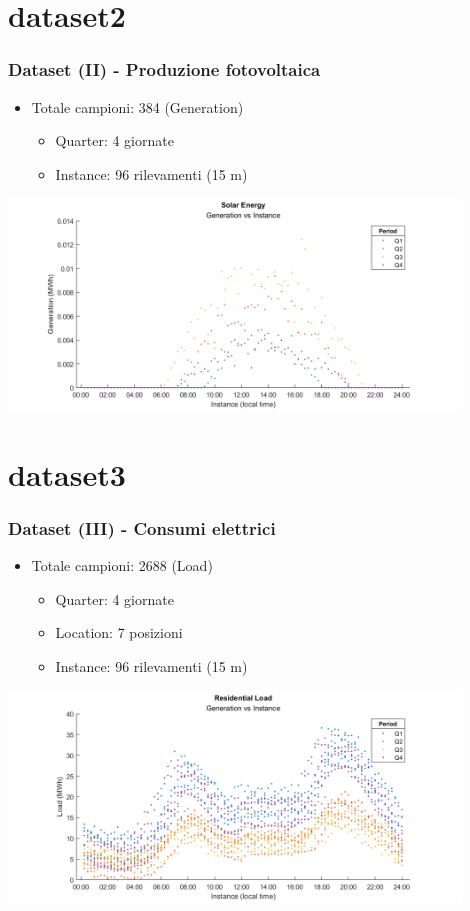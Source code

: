 \documentclass{beamer}
\begin{document}
\section{dataset2}
\begin{frame}
    \frametitle{Dataset (II) - Produzione fotovoltaica}
    \vfill
    
    \begin{itemize}
        \item Totale campioni: 384 (Generation) \begin{itemize}   
            \item Quarter: 4 giornate
            \item Instance: 96 rilevamenti (15 m)
        \end{itemize}
    \end{itemize}
    \vfill
    \centering
    \includegraphics[width=0.9\textwidth,keepaspectratio]{solar/all_by_period.png}
        
\end{frame}

\section{dataset3}
\begin{frame}
    \frametitle{Dataset (III) - Consumi elettrici}
    \vfill
    
    \begin{itemize}
        \item Totale campioni: 2688 (Load) \begin{itemize}   
            \item Quarter: 4 giornate
            \item Location: 7 posizioni
            \item Instance: 96 rilevamenti (15 m)
        \end{itemize}
    \end{itemize}
    \vfill
    \centering
    \includegraphics[width=0.9\textwidth,keepaspectratio]{all_residenzial_load_period.png}
        
\end{frame}
\end{document}
